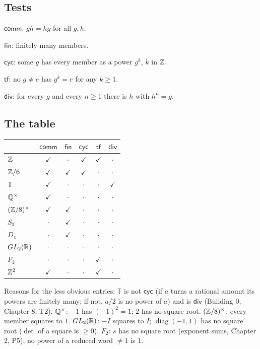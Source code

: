 \subsection*{Tests}

\begin{lines}
\item[\lab{D1}] $\mathsf{comm}$: $gh = hg$ for all $g, h$.
\item[\lab{D2}] $\mathsf{fin}$: finitely many members.
\item[\lab{D3}] $\mathsf{cyc}$: some $g$ has every member as a power $g^k$, $k$ in $\mathbb{Z}$.
\item[\lab{D4}] $\mathsf{tf}$: no $g \ne e$ has $g^k = e$ for any $k \ge 1$.
\item[\lab{D5}] $\mathsf{div}$: for every $g$ and every $n \ge 1$ there is $h$ with $h^n = g$.
\end{lines}

\subsection*{The table}

\begin{center}
\renewcommand{\arraystretch}{1.25}
\begin{tabular}{l|ccccc}
 & $\mathsf{comm}$ & $\mathsf{fin}$ & $\mathsf{cyc}$ & $\mathsf{tf}$ & $\mathsf{div}$ \\ \hline
$\mathbb{Z}$ & $\checkmark$ & $\cdot$ & $\checkmark$ & $\checkmark$ & $\cdot$ \\
$\mathbb{Z}/6$ & $\checkmark$ & $\checkmark$ & $\checkmark$ & $\cdot$ & $\cdot$ \\
$\mathbb{T}$ & $\checkmark$ & $\cdot$ & $\cdot$ & $\cdot$ & $\checkmark$ \\
$\mathbb{Q}^\times$ & $\checkmark$ & $\cdot$ & $\cdot$ & $\cdot$ & $\cdot$ \\
$(\mathbb{Z}/8)^\times$ & $\checkmark$ & $\checkmark$ & $\cdot$ & $\cdot$ & $\cdot$ \\
$S_3$ & $\cdot$ & $\checkmark$ & $\cdot$ & $\cdot$ & $\cdot$ \\
$D_4$ & $\cdot$ & $\checkmark$ & $\cdot$ & $\cdot$ & $\cdot$ \\
$GL_2(\mathbb{R})$ & $\cdot$ & $\cdot$ & $\cdot$ & $\cdot$ & $\cdot$ \\
$F_2$ & $\cdot$ & $\cdot$ & $\cdot$ & $\checkmark$ & $\cdot$ \\
$\mathbb{Z}^2$ & $\checkmark$ & $\cdot$ & $\cdot$ & $\checkmark$ & $\cdot$ \\
\end{tabular}
\end{center}
Reasons for the less obvious entries: $\mathbb{T}$ is not $\mathsf{cyc}$ (if $a$ turns a rational amount its powers are finitely many; if not, $a/2$ is no power of $a$) and is $\mathsf{div}$ (Building 0, Chapter 8, T2). $\mathbb{Q}^\times$: $-1$ has $(-1)^2 = 1$; $2$ has no square root. $(\mathbb{Z}/8)^\times$: every member squares to $1$. $GL_2(\mathbb{R})$: $-I$ squares to $I$; $\operatorname{diag}(-1, 1)$ has no square root ($\det$ of a square is $\ge 0$). $F_2$: $s$ has no square root (exponent sums, Chapter 2, P5); no power of a reduced word $\ne 1$ is $1$.


